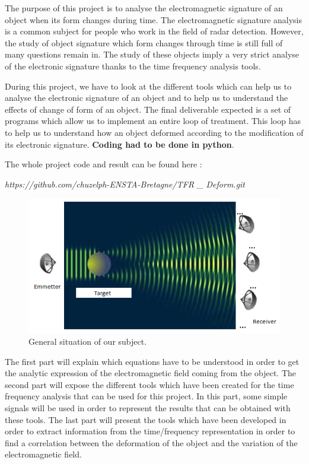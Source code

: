 The purpose of this project is to analyse the electromagnetic signature of an object when its form changes during time. The electromagnetic signature analysis is a common subject for people who work in the field of radar detection. However, the study of object signature which form changes through time is still full of many questions remain in. The study of these objects imply a very strict analyse of the electronic signature thanks to the time frequency analysis tools.

\bigskip

During this project, we have to look at the different tools which can help us to analyse the electronic signature of an object and to help us to understand the effects of change of form of an object. The final deliverable expected is a set of programs which allow us to implement an entire loop of treatment. This loop has to help us to understand how an object deformed according to the modification of its electronic signature. \textbf{Coding had to be done in python}.

\bigskip

The whole project code and result can be found here :

\textit{https://github.com/chuzelph-ENSTA-Bretagne/TFR \_ Deform.git}


\begin{figure}[H]
\centering
    \includegraphics[scale=1,angle=0]{Images/Image1.PNG}
    \caption{General situation of our subject.}
    \label{fig:Image1}
\end{figure}

\bigskip

The first part will explain which equations have to be understood in order to get the analytic expression of the electromagnetic field coming from the object.
The second part will expose the different tools which have been created for the time frequency analysis that can be used for this project. In this part, some simple signals will be used in order to represent the results that can be obtained with these tools.
The last part will present the tools which have been developed in order to extract information from the time/frequency representation in order to find a correlation between the deformation of the object and the variation of the electromagnetic field.
